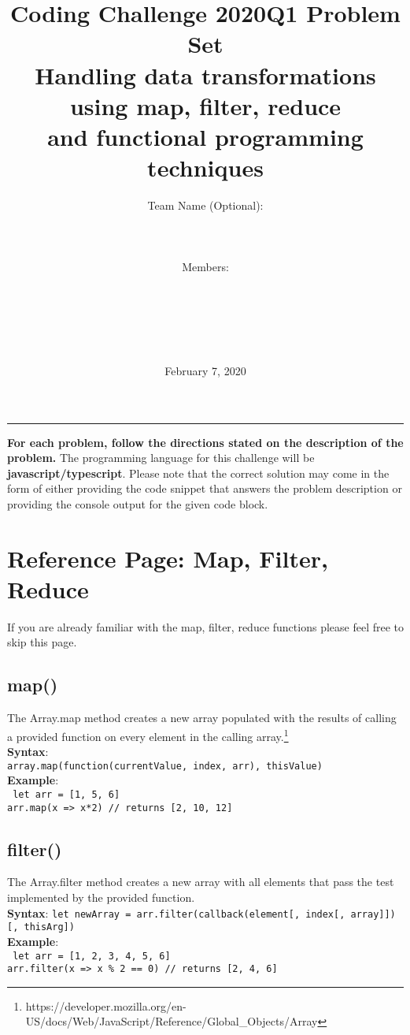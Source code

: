 \documentclass[12pt]{article}
\title{  Coding Challenge 2020Q1 Problem Set \\
  \large Handling data transformations using map, filter, reduce \\
    and functional programming techniques }
\author{Team Name (Optional): \\ \\ \\ \\  Members: \\ \\ \\ \\ \\ \\}
\date{February 7, 2020}
\begin{document}
  \maketitle

  \vspace{-0.3in}
  \noindent
  \rule{\linewidth}{0.4pt}

  \noindent
  \textbf{For each problem, follow the directions stated on the description of the problem.} The programming language for this challenge will be 
  \textbf{javascript/typescript}. Please note that the correct solution may come in the form of either providing the code snippet that answers the problem description or providing the console output for the given code block.
\newpage
\setcounter{secnumdepth}{0} %
\section{Reference Page: Map, Filter, Reduce}
If you are already familiar with the map, filter, reduce functions please feel free to skip this page.

\subsection{map()}
The Array.map method creates a new array populated with the results of calling a provided function on every element in the calling array.\footnote{\label{note1}https://developer.mozilla.org/en-US/docs/Web/JavaScript/Reference/Global\_Objects/Array} \\
\textbf{Syntax}: \\
\texttt{array.map(function(currentValue, index, arr), thisValue)} \\
\textbf{Example}:\\
\texttt{ let arr = [1, 5, 6] \\
arr.map(x => x*2) // returns [2, 10, 12]}

\subsection{filter()}
The Array.filter method creates a new array with all elements that pass 
the test implemented by the provided function.\footnotemark[\ref{note1}] \\
\textbf{Syntax}: \texttt{let newArray = arr.filter(callback(element[, index[, array]])[, thisArg])} \\
\textbf{Example}:\\
\texttt{ let arr = [1, 2, 3, 4, 5, 6] \\
arr.filter(x => x \% 2 == 0) // returns [2, 4, 6]
}
\end{document}
